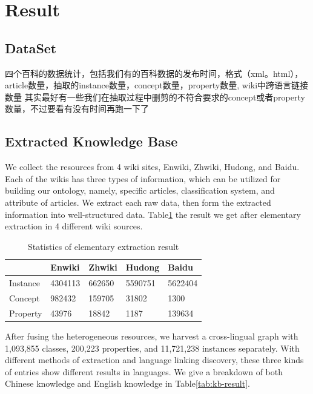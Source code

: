 \documentclass[runningheads,a4paper]{llncs}
\begin{document}
\section{Result}
\label{sec:result}
\subsection{DataSet}
四个百科的数据统计，包括我们有的百科数据的发布时间，格式（xml。html），article数量，抽取的instance数量，concept数量，property数量, wiki中跨语言链接数量
其实最好有一些我们在抽取过程中删剪的不符合要求的concept或者property数量，不过要看有没有时间再跑一下了
\subsection{Extracted Knowledge Base}
We collect the resources from 4 wiki sites, Enwiki, Zhwiki, Hudong, and Baidu. Each of the wikis has three types of information, which can be utilized for building our ontology, namely, specific articles, classification system, and attribute of articles. We extract each raw data, then form the extracted information into well-structured data. Table\ref{tab:extract-result} the result we get after elementary extraction in 4 different wiki sources.

\begin{table}[h]
\small
\centering
\caption{Statistics of elementary extraction result}
\label{tab:extract-result}
    \begin{tabular}{|l|l|l|l|l|}
        \hline
                 & Enwiki  & Zhwiki & Hudong  & Baidu   \\ \hline
        Instance & 4304113 & 662650 & 5590751 & 5622404 \\ \hline
        Concept  & 982432  & 159705 & 31802   & 1300    \\ \hline
        Property & 43976   & 18842  & 1187    & 139634  \\ \hline
    \end{tabular}
\end{table}

After fusing the heterogeneous resources, we harvest a cross-lingual graph with 1,093,855 classes, 200,223 properties, and 11,721,238 instances separately. With different methods of extraction and language linking discovery, these three kinds of entries show different results in languages. We give a breakdown of both Chinese knowledge and English knowledge in Table\ref{tab:kb-result}.
\end{document}
